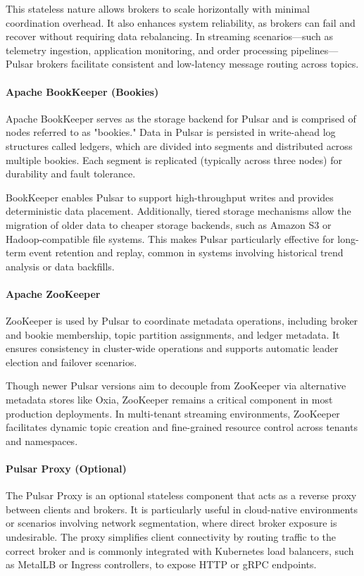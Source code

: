 This stateless nature allows brokers to scale horizontally with minimal coordination overhead. It also enhances system reliability, as brokers can fail and recover without requiring data rebalancing. In streaming scenarios—such as telemetry ingestion, application monitoring, and order processing pipelines—Pulsar brokers facilitate consistent and low-latency message routing across topics.

\paragraph{Apache BookKeeper (Bookies)}
Apache BookKeeper serves as the storage backend for Pulsar and is comprised of nodes referred to as "bookies." Data in Pulsar is persisted in write-ahead log structures called ledgers, which are divided into segments and distributed across multiple bookies. Each segment is replicated (typically across three nodes) for durability and fault tolerance.

BookKeeper enables Pulsar to support high-throughput writes and provides deterministic data placement. Additionally, tiered storage mechanisms allow the migration of older data to cheaper storage backends, such as Amazon S3 or Hadoop-compatible file systems. This makes Pulsar particularly effective for long-term event retention and replay, common in systems involving historical trend analysis or data backfills.

\paragraph{Apache ZooKeeper}
ZooKeeper \cite{zookeeper-docs} is used by Pulsar to coordinate metadata operations, including broker and bookie membership, topic partition assignments, and ledger metadata. It ensures consistency in cluster-wide operations and supports automatic leader election and failover scenarios.

Though newer Pulsar versions aim to decouple from ZooKeeper via alternative metadata stores like Oxia, ZooKeeper remains a critical component in most production deployments. In multi-tenant streaming environments, ZooKeeper facilitates dynamic topic creation and fine-grained resource control across tenants and namespaces.

\paragraph{Pulsar Proxy (Optional)}
The Pulsar Proxy is an optional stateless component that acts as a reverse proxy between clients and brokers. It is particularly useful in cloud-native environments or scenarios involving network segmentation, where direct broker exposure is undesirable. The proxy simplifies client connectivity by routing traffic to the correct broker and is commonly integrated with Kubernetes load balancers, such as MetalLB or Ingress controllers, to expose HTTP or gRPC endpoints.

